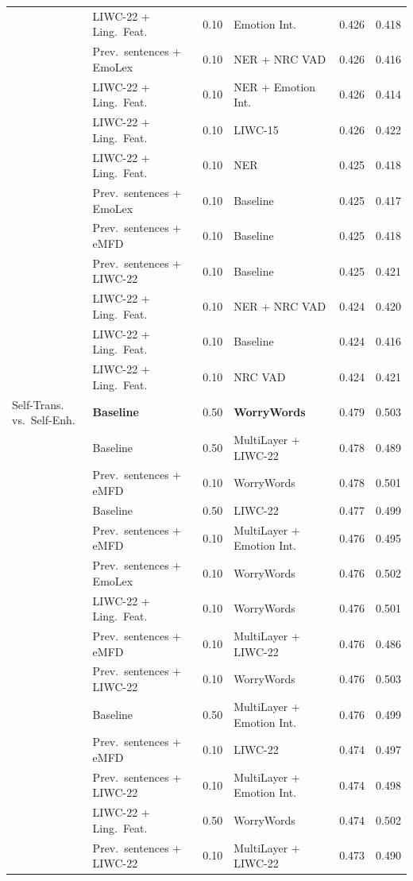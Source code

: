 {\begin{longtable}{llclcc}
 & LIWC-22 + Ling.\ Feat. & 0.10 & Emotion Int. & 0.426 & 0.418 \\
 & Prev.\ sentences + EmoLex & 0.10 & NER + NRC VAD & 0.426 & 0.416 \\
 & LIWC-22 + Ling.\ Feat. & 0.10 & NER + Emotion Int. & 0.426 & 0.414 \\
 & LIWC-22 + Ling.\ Feat. & 0.10 & LIWC-15 & 0.426 & 0.422 \\
 & LIWC-22 + Ling.\ Feat. & 0.10 & NER & 0.425 & 0.418 \\
 & Prev.\ sentences + EmoLex & 0.10 & Baseline & 0.425 & 0.417 \\
 & Prev.\ sentences + eMFD & 0.10 & Baseline & 0.425 & 0.418 \\
 & Prev.\ sentences + LIWC-22 & 0.10 & Baseline & 0.425 & 0.421 \\
 & LIWC-22 + Ling.\ Feat. & 0.10 & NER + NRC VAD & 0.424 & 0.420 \\
 & LIWC-22 + Ling.\ Feat. & 0.10 & Baseline & 0.424 & 0.416 \\
 & LIWC-22 + Ling.\ Feat. & 0.10 & NRC VAD & 0.424 & 0.421 \\
Self-Trans. vs.\ Self-Enh. & \textbf{Baseline} & 0.50 & \textbf{WorryWords} & 0.479 & 0.503 \\
 & Baseline & 0.50 & MultiLayer + LIWC-22 & 0.478 & 0.489 \\
 & Prev.\ sentences + eMFD & 0.10 & WorryWords & 0.478 & 0.501 \\
 & Baseline & 0.50 & LIWC-22 & 0.477 & 0.499 \\
 & Prev.\ sentences + eMFD & 0.10 & MultiLayer + Emotion Int. & 0.476 & 0.495 \\
 & Prev.\ sentences + EmoLex & 0.10 & WorryWords & 0.476 & 0.502 \\
 & LIWC-22 + Ling.\ Feat. & 0.10 & WorryWords & 0.476 & 0.501 \\
 & Prev.\ sentences + eMFD & 0.10 & MultiLayer + LIWC-22 & 0.476 & 0.486 \\
 & Prev.\ sentences + LIWC-22 & 0.10 & WorryWords & 0.476 & 0.503 \\
 & Baseline & 0.50 & MultiLayer + Emotion Int. & 0.476 & 0.499 \\
 & Prev.\ sentences + eMFD & 0.10 & LIWC-22 & 0.474 & 0.497 \\
 & Prev.\ sentences + LIWC-22 & 0.10 & MultiLayer + Emotion Int. & 0.474 & 0.498 \\
 & LIWC-22 + Ling.\ Feat. & 0.50 & WorryWords & 0.474 & 0.502 \\
 & Prev.\ sentences + LIWC-22 & 0.10 & MultiLayer + LIWC-22 & 0.473 & 0.490 \\

\end{longtable}}
